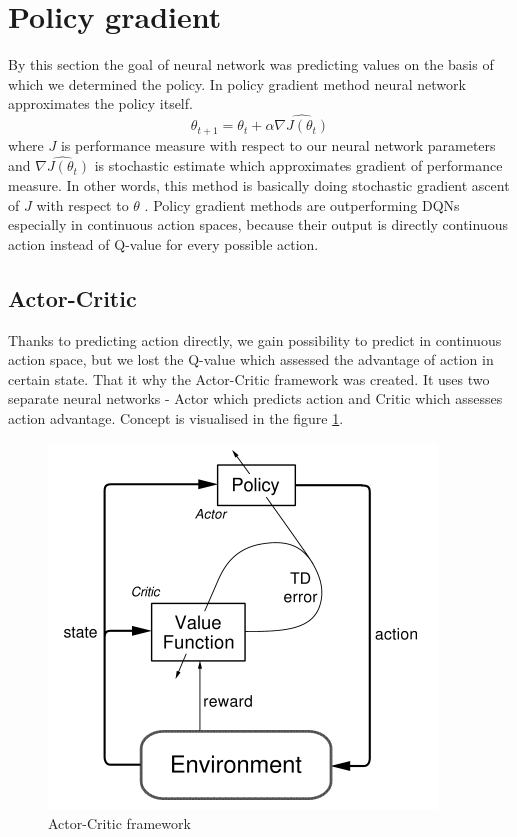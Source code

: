 \section{Policy gradient}
By this section the goal of neural network was predicting values on the basis of which we determined the policy. In policy gradient method neural network approximates the policy itself. 
\begin{equation}
\theta_{t+1} = \theta_t + \alpha \widehat{\nabla J(\theta_t)}
\end{equation}
where $J$ is performance measure with respect to our neural network parameters and $\widehat{\nabla J(\theta_t)}$ is stochastic estimate which approximates gradient of performance measure. In other words, this method is basically doing stochastic gradient ascent of $J$ with respect to $\theta$ \cite{sutton1999}. Policy gradient methods are outperforming DQNs especially in continuous action spaces, because their output is directly continuous action instead of Q-value for every possible action.

\subsection{Actor-Critic}
Thanks to predicting action directly, we gain possibility to predict in continuous action space, but we lost the Q-value which assessed the advantage of action in certain state. That it why the Actor-Critic framework was created. It uses two separate neural networks - Actor which predicts action and Critic which assesses action advantage. Concept is visualised in the figure \ref{fig:actorcritic}.
\begin{figure}[!h]
\centering
\includegraphics[scale=0.55]{fig/actor-critic.png}
\caption{Actor-Critic framework}
\label{fig:actorcritic}
\end{figure}
\clearpage

